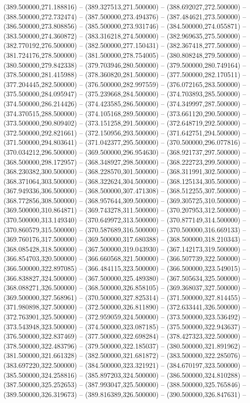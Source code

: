 (389.500000,271.188816) -- (389.327513,271.500000) -- (388.692027,272.500000) -- (388.500000,272.732474) -- (387.500000,273.494376) -- (387.484621,273.500000) -- (386.500000,273.808856) -- (385.500000,273.931746) -- (384.500000,274.055871) -- (383.500000,274.360872) -- (383.316218,274.500000) -- (382.969635,275.500000) -- (382.770192,276.500000) -- (382.500000,277.150431) -- (382.367418,277.500000) -- (381.724176,278.500000) -- (381.500000,278.754005) -- (380.808248,279.500000) -- (380.500000,279.842338) -- (379.703946,280.500000) -- (379.500000,280.749164) -- (378.500000,281.415988) -- (378.360820,281.500000) -- (377.500000,282.170511) -- (377.204445,282.500000) -- (376.500000,282.997559) -- (376.072165,283.500000) -- (375.500000,284.095947) -- (375.239668,284.500000) -- (374.703893,285.500000) -- (374.500000,286.214426) -- (374.423585,286.500000) -- (374.349997,287.500000) -- (374.370515,288.500000) -- (374.105168,289.500000) -- (373.661120,290.500000) -- (373.500000,290.809402) -- (373.151258,291.500000) -- (372.648719,292.500000) -- (372.500000,292.821661) -- (372.150956,293.500000) -- (371.642751,294.500000) -- (371.500000,294.803641) -- (371.042377,295.500000) -- (370.500000,296.077816) -- (370.034212,296.500000) -- (369.500000,296.954630) -- (368.921737,297.500000) -- (368.500000,298.172957) -- (368.348927,298.500000) -- (368.222723,299.500000) -- (368.230382,300.500000) -- (368.228570,301.500000) -- (368.311991,302.500000) -- (368.371064,303.500000) -- (368.322624,304.500000) -- (368.125134,305.500000) -- (367.949336,306.500000) -- (368.500000,307.471308) -- (368.512255,307.500000) -- (368.772856,308.500000) -- (368.957644,309.500000) -- (369.305725,310.500000) -- (369.500000,310.864871) -- (369.743278,311.500000) -- (370.207953,312.500000) -- (370.500000,313.149340) -- (370.649972,313.500000) -- (370.877149,314.500000) -- (370.860579,315.500000) -- (370.587689,316.500000) -- (370.500000,316.669133) -- (369.760176,317.500000) -- (369.500000,317.680388) -- (368.500000,318.210343) -- (368.085428,318.500000) -- (367.500000,319.043930) -- (367.142173,319.500000) -- (366.854703,320.500000) -- (366.660568,321.500000) -- (366.507739,322.500000) -- (366.500000,322.897085) -- (366.484115,323.500000) -- (366.500000,323.549015) -- (366.838827,324.500000) -- (367.500000,325.489380) -- (367.505634,325.500000) -- (368.088271,326.500000) -- (368.500000,326.858105) -- (369.368037,327.500000) -- (369.500000,327.568961) -- (370.500000,327.825314) -- (371.500000,327.814455) -- (371.980898,327.500000) -- (372.500000,326.811890) -- (372.633441,326.500000) -- (372.763901,325.500000) -- (372.959059,324.500000) -- (373.500000,323.536492) -- (373.543948,323.500000) -- (374.500000,323.087185) -- (375.500000,322.943637) -- (376.500000,322.837469) -- (377.500000,322.698284) -- (378.427323,322.500000) -- (378.500000,322.483796) -- (379.500000,322.185037) -- (380.500000,321.891962) -- (381.500000,321.661328) -- (382.500000,321.681872) -- (383.500000,322.285076) -- (383.697220,322.500000) -- (384.500000,323.321921) -- (384.670197,323.500000) -- (385.500000,324.258816) -- (385.897203,324.500000) -- (386.500000,324.810288) -- (387.500000,325.252653) -- (387.993047,325.500000) -- (388.500000,325.765846) -- (389.500000,326.319673) -- (389.816389,326.500000) -- (390.500000,326.847631) -- 